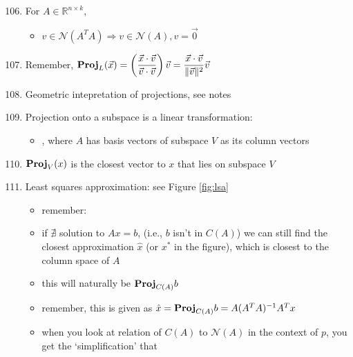 \documentclass[10pt,letterpaper]{article}
\begin{document}
\begin{enumerate}
\setcounter{enumi}{105}
\item  For $A \in \mathbb{R}^{n \times k}$, 

\begin{itemize}
\item $v \in \mathcal{N}(A ^{T} A) \Rightarrow v \in \mathcal{N}(A), v= \vec{0}$
\end{itemize}

\item Remember, $\displaystyle {\bf Proj}_L (\vec{x}) = \left(\frac{\vec{x} \cdot \vec{v} } {\vec{v} \cdot \vec{v}}\right) \vec{v} = \frac{\vec{x} \cdot \vec{v} } {\|\vec{v}\| ^2} \vec{v}$
\item Geometric intepretation of projections, see notes
\item Projection onto a subspace is a linear transformation:

\begin{itemize}
\item {}, where $A$ has basis vectors of subspace $V$ as its column vectors
\end{itemize}

\setcounter{enumi}{111}
\item  ${\bf Proj} _V ( x)$ is the closest vector to $x$ that lies on subspace $V$
\item Least squares approximation: see Figure \ref{fig:lsa}

\begin{itemize}
\item remember: 
\item if $\nexists$ solution to $Ax=b$, (i.e., $b$ isn't in $C(A)$) we can still find the closest approximation $\hat x$ (or $x^*$ in the figure), which is closest to the column space of $A$
\item this will naturally be ${\bf Proj}_{C(A)} b$
\item remember, this is given as $\hat x= {\bf Proj}_{C(A)} b= A(A ^{T} A) ^{-1} A ^{T} x$
\item when you look at relation of $C(A)$ to $\mathcal{N}(A)$ in the context of $p$, you get the `simplification' that 
\end{itemize}

\end{enumerate}
\end{document}
